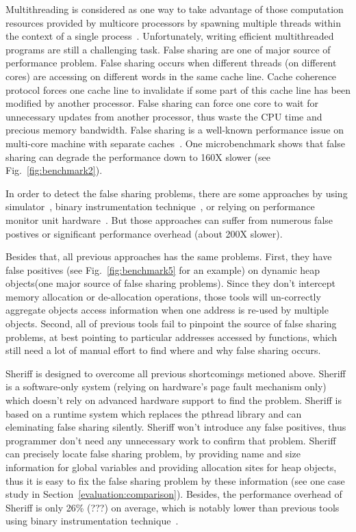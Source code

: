 \label{sec:intro}

Multithreading is considered as one way to take advantage of those 
computation resources provided by multicore processors by spawning multiple threads 
within the context of a single process~\cite{multithread}. 
Unfortunately, writing efficient multithreaded programs are still a challenging task. 
False sharing are one of major source of performance problem. 
False sharing occurs when different threads (on different cores) are accessing on
different words in the same cache line. 
Cache coherence protocol forces one cache line to invalidate if some part of this cache line
has been modified by another processor. False sharing can force one core to wait for 
unnecessary updates from another processor, thus waste the CPU time and precious memory bandwidth. 
False sharing is a well-known performance issue on multi-core machine with 
separate caches~\cite{falseshare:Analysis, falseshare:effect}. 
One microbenchmark shows that false sharing can degrade the performance 
down to 160X slower (see Fig.~\ref{fig:benchmark2}).

In order to detect the false sharing problems,
there are some approaches
by using simulator~\cite{falseshare:simulator}, 
binary instrumentation technique~\cite{falseshare:binaryinstrumentation1, falseshare:binaryinstrumentation2}, 
or relying on performance monitor unit hardware~\cite{detect:ptu, detect:intel}.
But those approaches can suffer from numerous false postives 
or significant performance overhead (about 200X slower). 

Besides that, all previous approaches has the same problems. 
First, they have false positives (see Fig.~\ref{fig:benchmark5} for an example) 
on dynamic heap objects(one major source of false sharing problems).
Since they don't intercept memory allocation or de-allocation operations, those tools will un-correctly 
aggregate objects access information when one address is re-used by multiple objects.
Second, all of previous tools fail to pinpoint the source of false sharing problems, 
at best pointing to particular addresses accessed by functions,
which still need a lot of manual effort to find where and why false sharing occurs.

Sheriff is designed to overcome all previous shortcomings metioned above. 
Sheriff is a software-only system (relying on hardware's page fault mechanism only) 
which doesn't rely on advanced hardware support to find the problem.
Sheriff is based on a runtime system which replaces the pthread library and can eleminating 
false sharing silently.
Sheriff won't introduce any false positives, thus programmer don't need any
unnecessary work to confirm that problem. 
Sheriff can precisely locate false sharing problem, 
by providing name and size information for global variables and providing allocation sites for heap objects, 
thus it is easy to fix the false sharing problem by these information (see one case study in 
Section~\ref{evaluation:comparison}). 
Besides, the performance overhead of Sheriff is only 26\% (???) on average, which is notably lower than
previous tools using binary instrumentation 
technique~\cite{falseshare:binaryinstrumentation1, falseshare:binaryinstrumentation2}.


